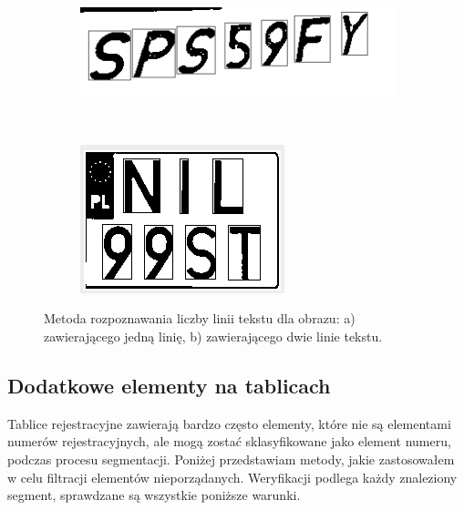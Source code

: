 \begin{figure}
  \centering
  \begin{subfigure}[b]{0.45\textwidth}
    \includegraphics[width=\textwidth]{img/apriori-liczba-linii-jeden}
    \label{fig:apriori_liczba_linii_jeden}
    \caption{}
  \end{subfigure}
  ~
  \begin{subfigure}[b]{0.45\textwidth}
    \includegraphics[width=\textwidth]{img/apriori-liczba-linii-dwa}
    \label{fig:apriori_liczba_linii_dwa}
    \caption{}
  \end{subfigure}
  \caption{Metoda rozpoznawania liczby linii tekstu dla obrazu: a) zawierającego jedną linię, b) zawierającego dwie linie tekstu.}
  \label{fig:apriori_liczba_linii}
\end{figure}

\subsection{Dodatkowe elementy na tablicach}\label{ssec:additional_elements}
Tablice rejestracyjne zawierają bardzo często elementy, które nie są elementami numerów rejestracyjnych, ale mogą zostać sklasyfikowane jako element numeru, podczas procesu segmentacji. Poniżej przedstawiam metody, jakie zastosowałem w celu filtracji elementów nieporządanych. Weryfikacji podlega każdy znaleziony segment, sprawdzane są wszystkie poniższe warunki.

